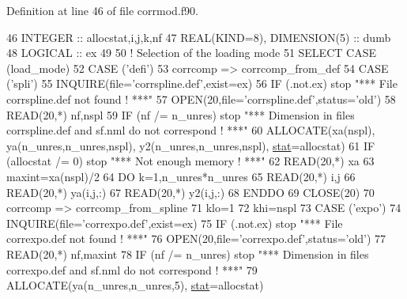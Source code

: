 Definition at line 46 of file corrmod.\+f90.


\begin{DoxyCode}
46     \textcolor{keywordtype}{INTEGER} :: allocstat,i,j,k,nf
47     \textcolor{keywordtype}{REAL(KIND=8)}, \textcolor{keywordtype}{DIMENSION(5)} :: dumb
48     \textcolor{keywordtype}{LOGICAL} :: ex
49 
50     \textcolor{comment}{! Selection of the loading mode}
51     \textcolor{keywordflow}{SELECT CASE} (load\_mode)
52     \textcolor{keywordflow}{CASE} (\textcolor{stringliteral}{'defi'})
53        corrcomp => corrcomp\_from\_def
54     \textcolor{keywordflow}{CASE} (\textcolor{stringliteral}{'spli'})
55        \textcolor{keyword}{INQUIRE}(file=\textcolor{stringliteral}{'corrspline.def'},exist=ex)
56        \textcolor{keywordflow}{IF} (.not.ex) stop \textcolor{stringliteral}{"*** File corrspline.def not found ! ***"}
57        \textcolor{keyword}{OPEN}(20,file=\textcolor{stringliteral}{'corrspline.def'},status=\textcolor{stringliteral}{'old'})
58        \textcolor{keyword}{READ}(20,*) nf,nspl
59        \textcolor{keywordflow}{IF} (nf /= n\_unres) stop \textcolor{stringliteral}{"*** Dimension in files corrspline.def and sf.nml do not correspond ! ***"}
60        \textcolor{keyword}{ALLOCATE}(xa(nspl), ya(n\_unres,n\_unres,nspl), y2(n\_unres,n\_unres,nspl), 
      \hyperlink{namespacestat}{stat}=allocstat)
61        \textcolor{keywordflow}{IF} (allocstat /= 0) stop \textcolor{stringliteral}{"*** Not enough memory ! ***"}
62        \textcolor{keyword}{READ}(20,*) xa
63        maxint=xa(nspl)/2
64        \textcolor{keywordflow}{DO} k=1,n\_unres*n\_unres
65           \textcolor{keyword}{READ}(20,*) i,j
66           \textcolor{keyword}{READ}(20,*) ya(i,j,:)
67           \textcolor{keyword}{READ}(20,*) y2(i,j,:)
68 \textcolor{keywordflow}{       ENDDO}
69        \textcolor{keyword}{CLOSE}(20)
70        corrcomp => corrcomp\_from\_spline
71        klo=1
72        khi=nspl
73     \textcolor{keywordflow}{CASE} (\textcolor{stringliteral}{'expo'})
74        \textcolor{keyword}{INQUIRE}(file=\textcolor{stringliteral}{'correxpo.def'},exist=ex)
75        \textcolor{keywordflow}{IF} (.not.ex) stop \textcolor{stringliteral}{"*** File correxpo.def not found ! ***"}
76        \textcolor{keyword}{OPEN}(20,file=\textcolor{stringliteral}{'correxpo.def'},status=\textcolor{stringliteral}{'old'})
77        \textcolor{keyword}{READ}(20,*) nf,maxint
78        \textcolor{keywordflow}{IF} (nf /= n\_unres) stop \textcolor{stringliteral}{"*** Dimension in files correxpo.def and sf.nml do not correspond ! ***"}
79        \textcolor{keyword}{ALLOCATE}(ya(n\_unres,n\_unres,5), \hyperlink{namespacestat}{stat}=allocstat)

\end{DoxyCode}
